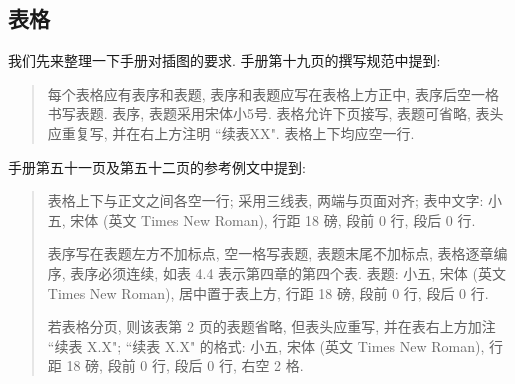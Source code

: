 \subsection{表格}

我们先来整理一下手册对插图的要求. 手册第十九页的撰写规范中提到:
\begin{quote}
  每个表格应有表序和表题, 表序和表题应写在表格上方正中, 表序后空一格书写表题. 表序, 表题采用宋体小5号. 表格允许下页接写, 表题可省略, 表头应重复写, 并在右上方注明 ``{\songti 续表XX}". 表格上下均应空一行.
\end{quote}
手册第五十一页及第五十二页的参考例文中提到:
\begin{quote}
  表格上下与正文之间各空一行;
  采用三线表, 两端与页面对齐;
  表中文字: 小五, 宋体 (英文 Times New Roman), 行距 18 磅, 段前 0 行, 段后 0 行.

  表序写在表题左方不加标点, 空一格写表题, 表题末尾不加标点, 表格逐章编序, 表序必须连续, 如表 4.4 表示第四章的第四个表. 表题: 小五, 宋体 (英文 Times New Roman), 居中置于表上方, 行距 18 磅, 段前 0 行, 段后 0 行.

  若表格分页, 则该表第 2 页的表题省略, 但表头应重写, 并在表右上方加注 ``续表 X.X";
  ``续表 X.X" 的格式: 小五, 宋体 (英文 Times New Roman), 行距 18 磅, 段前 0 行, 段后 0 行, 右空 2 格.
\end{quote}
